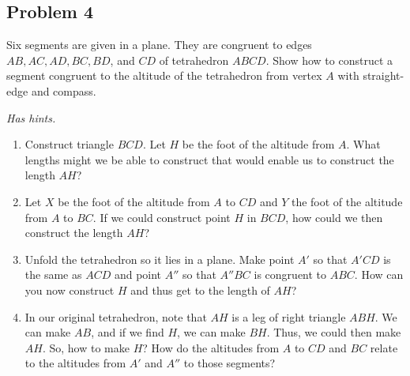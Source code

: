 \subsection{Problem 4}

Six segments are given in a plane. They are congruent to edges $AB, AC, AD, BC, BD$, and $CD$ of tetrahedron $ABCD$. Show how to construct a segment congruent to the altitude of the tetrahedron from vertex $A$ with straight-edge and compass.

\textit{Has hints.}
\begin{sketch}
    \begin{enumerate}
        \item Construct triangle $BCD$. Let $H$ be the foot of the altitude from $A$. What lengths might we be able to construct that would enable us to construct the length $AH$?
        \item Let $X$ be the foot of the altitude from $A$ to $CD$ and $Y$ the foot of the altitude from $A$ to $BC$. If we could construct point $H$ in $BCD$, how could we then construct the length $AH$?
        \item Unfold the tetrahedron so it lies in a plane. Make point $A'$ so that $A'CD$ is the same as $ACD$ and point $A''$ so that $A''BC$ is congruent to $ABC$. How can you now construct $H$ and thus get to the length of $AH$?
        \item In our original tetrahedron, note that $AH$ is a leg of right triangle $ABH$. We can make $AB$, and if we find $H$, we can make $BH$. Thus, we could then make $AH$. So, how to make $H$? How do the altitudes from $A$ to $CD$ and $BC$ relate to the altitudes from $A'$ and $A''$ to those segments?
    \end{enumerate}
\end{sketch}

